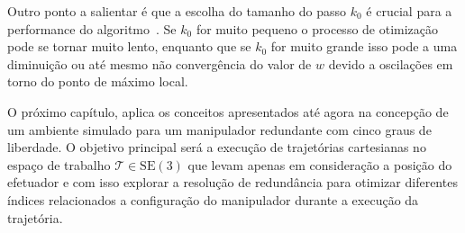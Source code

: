 Outro ponto a salientar é que a escolha do tamanho do passo \(k_0\) é crucial
para a performance do algoritmo~\cite{siciliano_springer_2008}. Se \(k_0\) 
for muito pequeno o processo de otimização pode se tornar muito lento, enquanto 
que se \(k_0\) for muito grande isso pode a uma diminuição ou até
 mesmo não convergência do valor de \(w\) devido a oscilações em torno do ponto 
 de máximo local.

O próximo capítulo, aplica os conceitos apresentados até agora na
concepção de um ambiente simulado para um manipulador redundante com cinco
graus de liberdade. O objetivo principal será a execução de trajetórias
cartesianas no espaço de trabalho \(\mathcal{T} \in \text{SE}(3)\) que levam
apenas em consideração a posição do efetuador e com isso explorar a resolução
de redundância para otimizar diferentes índices relacionados a configuração do
manipulador durante a execução da trajetória.
